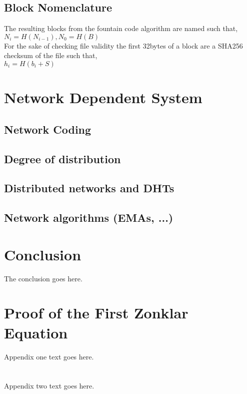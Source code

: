 \documentclass[journal]{IEEEtran}
\begin{document}
\subsection{Block Nomenclature}
The resulting blocks from the fountain code algorithm are named such that,\\

$N_i = H(N_{i-1}), N_0 = H(B)$\\

For the sake of checking file validity the first 32bytes of a block are a SHA256 checksum of the file such that,\\

$h_i = H(b_i + S)$


\section{Network Dependent System}

\subsection{Network Coding}

\subsection{Degree of distribution}

\subsection{Distributed networks and DHTs}

\subsection{Network algorithms (EMAs, ...)}

\section{Conclusion}
The conclusion goes here.


\appendices
\section{Proof of the First Zonklar Equation}
Appendix one text goes here.

\section{}
Appendix two text goes here.
\end{document}
